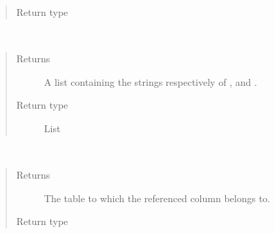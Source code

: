 \documentclass[letterpaper,10pt,english]{sphinxmanual}
\begin{document}
\begin{fulllineitems}
\begin{fulllineitems}
\begin{quote}
\begin{description}
\item[{Return type}] \leavevmode
\sphinxAtStartPar
{\hyperref[\detokenize{model:simple_sql.model.column.Column}]{}}

\end{description}\end{quote}

\end{fulllineitems}


\begin{fulllineitems}
\label{\detokenize{model:simple_sql.model.foreign_key.ForeignKey.get_strings}}~\begin{quote}\begin{description}
\item[{Returns}] \leavevmode
\sphinxAtStartPar
A list containing the strings respectively of , 
and .

\item[{Return type}] \leavevmode
\sphinxAtStartPar
List

\end{description}\end{quote}

\end{fulllineitems}


\begin{fulllineitems}
\label{\detokenize{model:simple_sql.model.foreign_key.ForeignKey.get_table}}~\begin{quote}\begin{description}
\item[{Returns}] \leavevmode
\sphinxAtStartPar
The table to which the referenced column belongs to.

\item[{Return type}] \leavevmode
\sphinxAtStartPar
{\hyperref[\detokenize{model:simple_sql.model.table.Table}]{}}


\end{description}
\end{quote}
\end{fulllineitems}
\end{fulllineitems}
\end{document}
